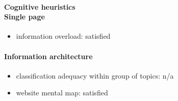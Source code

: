 \begin{enumerate}
	\paragraph*{Cognitive heuristics \\ Single page}
	\begin{itemize}
		\item information overload: satisfied
	\end{itemize}	

	\paragraph*{Information architecture}
	\begin{itemize}
		\item classification adequacy within group of topics: n/a
		\item website mental map: satisfied
	\end{itemize}
\end{enumerate}